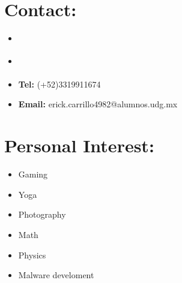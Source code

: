 \documentclass{article}
\begin{document}
\begin{minipage}[t]{8cm}
\section*{Contact:}
    \begin{itemize}
        \setlength\itemsep{0.01cm}
        \item \href{https://www.linkedin.com/in/erick-alejandro-carrillo-lopez-988112219/}{\color{Blue}{Linkedin}}
        \item \href{https://github.com/alecksandr26}{\color{Blue}{GitHub}}
        \item \textbf{Tel:} (+52)3319911674
        \item \textbf{Email:} erick.carrillo4982@alumnos.udg.mx
    \end{itemize}
    \section*{Personal Interest:}
    \begin{itemize}
        \item Gaming
        \item Yoga
        \item Photography
        \item Math
        \item Physics
        \item Malware develoment
    \end{itemize}
\end{minipage}
\space
\space
\space
\space
\space
\end{document}
